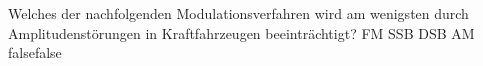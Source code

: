     {Welches der nachfolgenden Modulationsverfahren wird am wenigsten durch Amplitudenstörungen in Kraftfahrzeugen beeinträchtigt?}
    {FM}
    {SSB}
    {DSB}
    {AM}
    {false}{false}